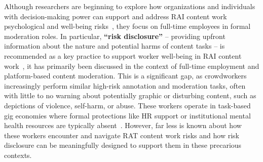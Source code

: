 Although researchers are beginning to explore how organizations and individuals with decision-making power can support and address RAI content work psychological and well-being risks~\cite{qian2025aura, qian2025locating, steiger_psychological_2021, bharucha2023content}, they focus on full-time employees in formal moderation roles.
In particular, \textbf{``risk disclosure''} -- providing upfront information about the nature and potential harms of content tasks -- is recommended as a key practice to support worker well-being in RAI content work~\cite{bharucha2023content, qian2025aura}, it has primarily been discussed in the context of full-time employment and platform-based content moderation. This is a significant gap, as crowdworkers increasingly perform similar high-risk annotation and moderation tasks, often with little to no warning about potentially graphic or disturbing content, such as depictions of violence, self-harm, or abuse. These workers operate in task-based gig economies where formal protections like HR support or institutional mental health resources are typically absent~\cite{irani2013turkopticon, martin2014being, salehi2018ink, silberman2018responsible, toxtli2021quantifying, schlicher2021flexible}. However, far less is known about how these workers encounter and navigate RAT content work risks and how risk disclosure can be meaningfully designed to support them in these precarious contexts. %



